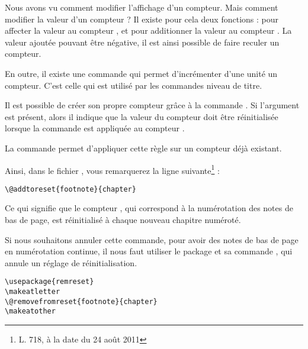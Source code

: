 Nous avons vu comment modifier l'affichage d'un compteur. Mais comment modifier la valeur d'un compteur ? Il existe pour cela deux fonctions :  pour affecter la valeur  au compteur , et  pour additionner la valeur  au compteur . La valeur ajoutée pouvant être négative, il est ainsi possible de faire reculer un compteur.

En outre, il existe une commande  qui permet d'incrémenter d'une unité un compteur. C'est celle qui est utilisé par les commandes niveau de titre.



Il est possible de créer son propre compteur grâce à la commande . Si l'argument  est présent, alors il indique que la valeur du compteur  doit être réinitialisée lorsque la commande  est appliquée au compteur .

La commande    permet d'appliquer cette règle sur un compteur déjà existant.

Ainsi, dans le fichier , vous remarquerez la ligne suivante\footnote{L. 718, à la date du 24 août 2011}  :
\begin{verbatim}
\@addtoreset{footnote}{chapter}
\end{verbatim} 

Ce qui signifie que le compteur  , qui correspond à la numérotation des notes de bas de page, est réinitialisé à chaque nouveau chapitre numéroté. 

Si nous souhaitons annuler cette commande, pour avoir des notes de bas de page en numérotation continue, il nous faut utiliser le package  et sa commande , qui annule un réglage de réinitialisation.

\begin{verbatim}
\usepackage{remreset}
\makeatletter
\@removefromreset{footnote}{chapter}
\makeatother
\end{verbatim}
